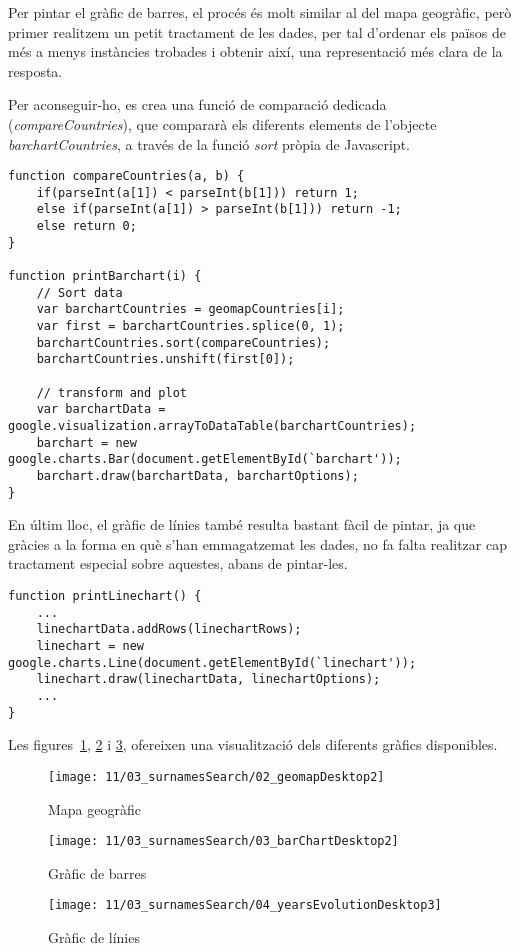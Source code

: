 Per pintar el gràfic de barres, el procés és molt similar al del mapa geogràfic, però primer realitzem un petit tractament de les dades, per tal d'ordenar els països de més a menys instàncies trobades i obtenir així, una representació més clara de la resposta.

Per aconseguir-ho, es crea una funció de comparació dedicada (\emph{compare\-Countries}), que compararà els diferents elements de l'objecte \emph{barchartCountries}, a través de la funció \emph{sort} pròpia de Javascript.

\begin{lstlisting}[style=rawOwn,caption={Creació del gràfic de barres}]
function compareCountries(a, b) {
    if(parseInt(a[1]) < parseInt(b[1])) return 1;
    else if(parseInt(a[1]) > parseInt(b[1])) return -1;
    else return 0;
}

function printBarchart(i) {
    // Sort data
    var barchartCountries = geomapCountries[i];
    var first = barchartCountries.splice(0, 1);
    barchartCountries.sort(compareCountries);
    barchartCountries.unshift(first[0]);

    // transform and plot
    var barchartData = google.visualization.arrayToDataTable(barchartCountries);
    barchart = new google.charts.Bar(document.getElementById(`barchart'));
    barchart.draw(barchartData, barchartOptions);
}
\end{lstlisting}

En últim lloc, el gràfic de línies també resulta bastant fàcil de pintar, ja que gràcies a la forma en què s’han emmagatzemat les dades, no fa falta realitzar cap tractament especial sobre aquestes, abans de pintar-les.

\begin{lstlisting}[style=rawOwn,caption={Creació del gràfic de línies}]
function printLinechart() {
    ...
    linechartData.addRows(linechartRows);
    linechart = new google.charts.Line(document.getElementById(`linechart'));
    linechart.draw(linechartData, linechartOptions);
    ...
}
\end{lstlisting}

Les figures~\ref{fig:geomap}, \ref{fig:barchart} i \ref{fig:linechart}, ofereixen una visualització dels diferents gràfics disponibles.

\begin{figure}[h]
    \texttt{[image: 11/03\_surnamesSearch/02\_geomapDesktop2]}
    \centering
    \caption{Mapa geogràfic}\label{fig:geomap}
\end{figure}

\begin{figure}[h]
    \texttt{[image: 11/03\_surnamesSearch/03\_barChartDesktop2]}
    \centering
    \caption{Gràfic de barres}\label{fig:barchart}
\end{figure}

\begin{figure}[h]
    \texttt{[image: 11/03\_surnamesSearch/04\_yearsEvolutionDesktop3]}
    \centering
    \caption{Gràfic de línies}\label{fig:linechart}
\end{figure}
